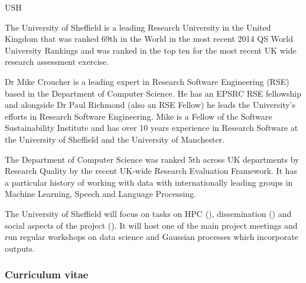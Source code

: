 \begin{sitedescription}{USH}



The University of Sheffield is a leading Research University in the
United Kingdom that was ranked 69th in the World in the most recent
2014 QS World University Rankings and was ranked in the top ten for
the most recent UK wide research assessment exercise.  

Dr Mike Croucher is a leading expert in Research Software Engineering (RSE) 
based in the Department of Computer Science. He has an EPSRC RSE fellowship and 
alongside Dr Paul Richmond (also an RSE Fellow) he leads the University's 
efforts in Research Software Engineering. Mike is a Fellow of the Software
Sustainability Institute and has over 10 years experience in Research Software
at the University of Sheffield and the University of Manchester.


The Department of Computer Science was ranked 5th across UK
departments by Research Quality by the recent UK-wide Research
Evaluation Framework. It has a particular history of working with data
with internationally leading groups in Machine Learning, Speech and
Language Processing.

The University of Sheffield will focus on tasks on HPC (),
dissemination () and social aspects of the project
(). It will host one of the main project meetings
and run regular workshops on data science and Gaussian processes which incorporate
\TheProject outputs.

\subsubsection*{Curriculum vitae}


\end{sitedescription}
